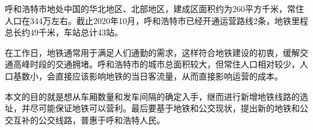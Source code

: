 
\setlength{\parindent}{2em}
{呼和浩特市地处中国的华北地区、北部地区，建成区面积约为260平方千米，常住人口在344万左右。截止2020年10月，呼和浩特市已经开通运营路线2条，地铁里程总长约49千米，车站总计43站。}

{在工作日，地铁通常用于满足人们通勤的需求，这样符合地铁建设的初衷，缓解交通高峰时段的交通拥堵。呼和浩特市的城市总面积较大，但常住人口相对较少，人口基数小，会直接应该影响地铁的当日客流量，从而直接影响运营的成本。}

{本文的目的就是想从车厢数量和发车间隔的确定入手，继而进行新增地铁线路的选址，并尽可能保证地铁可以营利。最后要基于地铁和公交现状，提出新的地铁和公交互补的公交线路，普惠于呼和浩特人民。}
